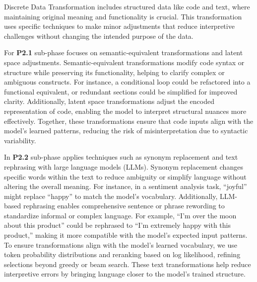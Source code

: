 Discrete Data Transformation includes structured data like code and text, where maintaining original meaning and functionality is crucial. This transformation uses specific techniques to make minor adjustments that reduce interpretive challenges without changing the intended purpose of the data.


For \textbf{P2.1} sub-phase focuses on semantic-equivalent transformations and latent space adjustments. Semantic-equivalent transformations modify code syntax or structure while preserving its functionality, helping to clarify complex or ambiguous constructs. For instance, a conditional loop could be refactored into a functional equivalent, or redundant sections could be simplified for improved clarity. Additionally, latent space transformations adjust the encoded representation of code, enabling the model to interpret structural nuances more effectively. Together, these transformations ensure that code inputs align with the model’s learned patterns, reducing the risk of misinterpretation due to syntactic variability.


In \textbf{P2.2}  sub-phase applies techniques such as synonym replacement and text rephrasing with large language models (LLMs). Synonym replacement changes specific words within the text to reduce ambiguity or simplify language without altering the overall meaning. For instance, in a sentiment analysis task, “joyful” might replace “happy” to match the model’s vocabulary. Additionally, LLM-based rephrasing enables comprehensive sentence or phrase rewording to standardize informal or complex language. For example, “I’m over the moon about this product” could be rephrased to “I’m extremely happy with this product,” making it more compatible with the model’s expected input patterns. To ensure transformations align with the model’s learned vocabulary, we use token probability distributions and reranking based on log likelihood, refining selections beyond greedy or beam search. These text transformations help reduce interpretive errors by bringing language closer to the model’s trained structure.

